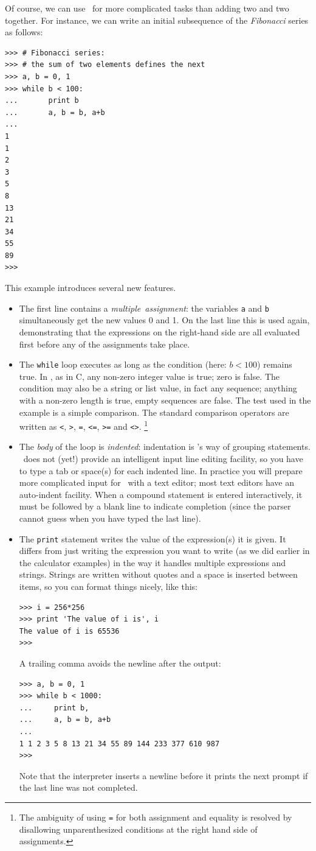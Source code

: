 Of course, we can use \Python\ for more complicated tasks than adding two
and two together.
For instance, we can write an initial subsequence of the
{\em Fibonacci}
series as follows:
\bcode\begin{verbatim}
>>> # Fibonacci series:
>>> # the sum of two elements defines the next
>>> a, b = 0, 1
>>> while b < 100:
...       print b
...       a, b = b, a+b
... 
1
1
2
3
5
8
13
21
34
55
89
>>> 
\end{verbatim}\ecode
This example introduces several new features.
\begin{itemize}
\item
The first line contains a
{\em multiple\ assignment}:
the variables
{\tt a}
and
{\tt b}
simultaneously get the new values 0 and 1.
On the last line this is used again, demonstrating that the expressions
on the right-hand side are all evaluated first before any of the
assignments take place.
\item
The
{\tt while}
loop executes as long as the condition (here: $b < 100$) remains true.
In \Python, as in C, any non-zero integer value is true; zero is false.
The condition may also be a string or list value, in fact any sequence;
anything with a non-zero length is true, empty sequences are false.
The test used in the example is a simple comparison.
The standard comparison operators are written as
{\tt <},
{\tt >},
{\tt =},
{\tt <=},
{\tt >=}
and
{\tt <>}.%
\footnote{
	The ambiguity of using {\tt =}
	for both assignment and equality is resolved by disallowing
	unparenthesized conditions at the right hand side of assignments.
}
\item
The
{\em body}
of the loop is
{\em indented}: indentation is \Python's way of grouping statements.
\Python\ does not (yet!) provide an intelligent input line editing
facility, so you have to type a tab or space(s) for each indented line.
In practice you will prepare more complicated input for \Python\ with a
text editor; most text editors have an auto-indent facility.
When a compound statement is entered interactively, it must be
followed by a blank line to indicate completion (since the parser
cannot guess when you have typed the last line).
\item
The
{\tt print}
statement writes the value of the expression(s) it is given.
It differs from just writing the expression you want to write (as we did
earlier in the calculator examples) in the way it handles multiple
expressions and strings.
Strings are written without quotes and a space is inserted between
items, so you can format things nicely, like this:
\bcode\begin{verbatim}
>>> i = 256*256
>>> print 'The value of i is', i
The value of i is 65536
>>> 
\end{verbatim}\ecode
A trailing comma avoids the newline after the output:
\bcode\begin{verbatim}
>>> a, b = 0, 1
>>> while b < 1000:
...     print b,
...     a, b = b, a+b
... 
1 1 2 3 5 8 13 21 34 55 89 144 233 377 610 987
>>> 
\end{verbatim}\ecode
Note that the interpreter inserts a newline before it prints the next
prompt if the last line was not completed.
\end{itemize}

